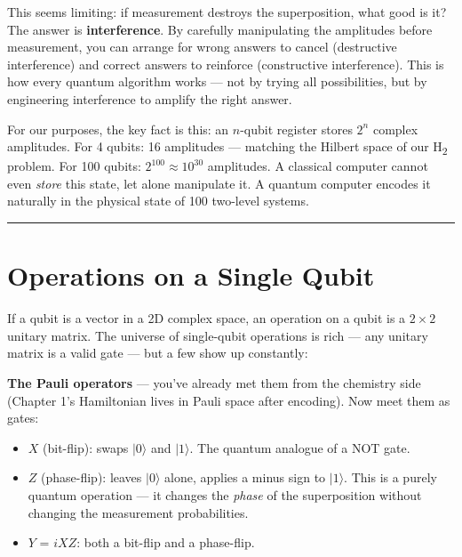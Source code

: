 \documentclass[
  11pt,
  oneside]{book}
\providecommand{\tightlist}{%
  \setlength{\itemsep}{0pt}\setlength{\parskip}{0pt}}
\begin{document}
This seems limiting: if measurement destroys the superposition, what
good is it? The answer is \textbf{interference}. By carefully
manipulating the amplitudes before measurement, you can arrange for
wrong answers to cancel (destructive interference) and correct answers
to reinforce (constructive interference). This is how every quantum
algorithm works --- not by trying all possibilities, but by engineering
interference to amplify the right answer.

For our purposes, the key fact is this: an \(n\)-qubit register stores
\(2^n\) complex amplitudes. For 4 qubits: 16 amplitudes --- matching the
Hilbert space of our H\textsubscript{2} problem. For 100 qubits:
\(2^{100} \approx 10^{30}\) amplitudes. A classical computer cannot even
\emph{store} this state, let alone manipulate it. A quantum computer
encodes it naturally in the physical state of 100 two-level systems.

\begin{center}\rule{0.5\linewidth}{0.5pt}\end{center}

\section{Operations on a Single
Qubit}\label{operations-on-a-single-qubit}

If a qubit is a vector in a 2D complex space, an operation on a qubit is
a \(2 \times 2\) unitary matrix. The universe of single-qubit operations
is rich --- any unitary matrix is a valid gate --- but a few show up
constantly:

\textbf{The Pauli operators} --- you've already met them from the
chemistry side (Chapter 1's Hamiltonian lives in Pauli space after
encoding). Now meet them as gates:

\begin{itemize}
\tightlist
\item
  \textbf{\(X\)} (bit-flip): swaps \(\lvert 0\rangle\) and
  \(\lvert 1\rangle\). The quantum analogue of a NOT gate.
\item
  \textbf{\(Z\)} (phase-flip): leaves \(\lvert 0\rangle\) alone, applies
  a minus sign to \(\lvert 1\rangle\). This is a purely quantum
  operation --- it changes the \emph{phase} of the superposition without
  changing the measurement probabilities.
\item
  \textbf{\(Y\)} = \(iXZ\): both a bit-flip and a phase-flip.
\end{itemize}
\end{document}

